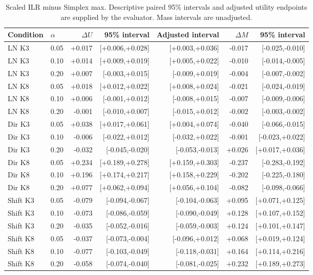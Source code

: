 \begin{table}[p]
\centering\scriptsize
\caption{Scaled ILR minus Simplex max. Descriptive paired 95\% intervals and adjusted utility endpoints are supplied by the evaluator. Mass intervals are unadjusted.}
\begin{tabular}{llrrrrr}
\toprule
Condition & $\alpha$ & $\Delta U$ & 95\% interval & Adjusted interval & $\Delta M$ & 95\% interval \\
\midrule
LN K3 & 0.05 & +0.017 & [+0.006,+0.028] & [+0.003,+0.036] & -0.017 & [-0.025,-0.010] \\
LN K3 & 0.10 & +0.014 & [+0.009,+0.019] & [+0.005,+0.022] & -0.010 & [-0.014,-0.005] \\
LN K3 & 0.20 & +0.007 & [-0.003,+0.015] & [-0.009,+0.019] & -0.004 & [-0.007,-0.002] \\
LN K8 & 0.05 & +0.018 & [+0.012,+0.022] & [+0.008,+0.024] & -0.021 & [-0.024,-0.019] \\
LN K8 & 0.10 & +0.006 & [-0.001,+0.012] & [-0.008,+0.015] & -0.007 & [-0.009,-0.006] \\
LN K8 & 0.20 & -0.001 & [-0.010,+0.007] & [-0.015,+0.012] & -0.002 & [-0.003,-0.002] \\
Dir K3 & 0.05 & +0.038 & [+0.017,+0.061] & [+0.004,+0.074] & -0.040 & [-0.066,-0.015] \\
Dir K3 & 0.10 & -0.006 & [-0.022,+0.012] & [-0.032,+0.022] & -0.001 & [-0.023,+0.022] \\
Dir K3 & 0.20 & -0.032 & [-0.045,-0.020] & [-0.053,-0.013] & +0.026 & [+0.017,+0.036] \\
Dir K8 & 0.05 & +0.234 & [+0.189,+0.278] & [+0.159,+0.303] & -0.237 & [-0.283,-0.192] \\
Dir K8 & 0.10 & +0.196 & [+0.174,+0.217] & [+0.158,+0.229] & -0.202 & [-0.225,-0.180] \\
Dir K8 & 0.20 & +0.077 & [+0.062,+0.094] & [+0.056,+0.104] & -0.082 & [-0.098,-0.066] \\
Shift K3 & 0.05 & -0.079 & [-0.094,-0.067] & [-0.104,-0.063] & +0.095 & [+0.071,+0.125] \\
Shift K3 & 0.10 & -0.073 & [-0.086,-0.059] & [-0.090,-0.049] & +0.128 & [+0.107,+0.152] \\
Shift K3 & 0.20 & -0.035 & [-0.052,-0.016] & [-0.059,-0.003] & +0.124 & [+0.101,+0.147] \\
Shift K8 & 0.05 & -0.037 & [-0.073,-0.004] & [-0.096,+0.012] & +0.068 & [+0.019,+0.124] \\
Shift K8 & 0.10 & -0.077 & [-0.103,-0.049] & [-0.118,-0.031] & +0.164 & [+0.114,+0.216] \\
Shift K8 & 0.20 & -0.058 & [-0.074,-0.040] & [-0.081,-0.025] & +0.232 & [+0.189,+0.273] \\
\bottomrule
\end{tabular}
\end{table}
